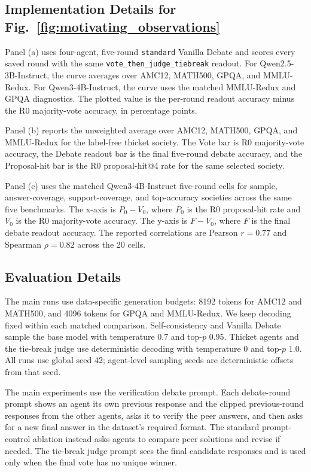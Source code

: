 \documentclass{article}
\newcommand{\figref}[1]{Fig.~\ref{#1}}
\begin{document}
\subsection{Implementation Details for \figref{fig:motivating_observations}}
\label{app:motivating_observations}

Panel (a) uses four-agent, five-round \texttt{standard} Vanilla Debate and scores
every saved round with the same \texttt{vote\_then\_judge\_tiebreak} readout.
For Qwen2.5-3B-Instruct, the curve averages over AMC12, MATH500, GPQA, and
MMLU-Redux. For Qwen3-4B-Instruct, the curve uses the
matched MMLU-Redux and GPQA diagnostics. The plotted value is the per-round
readout accuracy minus the R0 majority-vote accuracy, in percentage points.

Panel (b) reports the unweighted average over AMC12, MATH500, GPQA, and
MMLU-Redux for the label-free thicket society. The Vote bar is R0
majority-vote accuracy, the Debate readout bar is the final five-round debate
accuracy, and the Proposal-hit bar is the R0 proposal-hit@4 rate for the same
selected society.

Panel (c) uses the matched Qwen3-4B-Instruct five-round cells for sample,
answer-coverage, support-coverage, and top-accuracy societies across the same
five benchmarks. The x-axis is $P_0 - V_0$, where $P_0$ is the R0 proposal-hit
rate and $V_0$ is the R0 majority-vote accuracy. The y-axis is $F - V_0$, where
$F$ is the final debate readout accuracy. The reported correlations are Pearson
$r=0.77$ and Spearman $\rho=0.82$ across the 20 cells.

\subsection{Evaluation Details}
\label{app:eval_details}

The main runs use data-specific generation budgets: 8192 tokens for AMC12 and
MATH500, and 4096 tokens for GPQA and MMLU-Redux. We keep
decoding fixed within each matched comparison. Self-consistency and Vanilla
Debate sample the base model with temperature 0.7 and top-$p$ 0.95. Thicket
agents and the tie-break judge use deterministic decoding with temperature 0
and top-$p$ 1.0. All runs use global seed 42; agent-level sampling seeds are
deterministic offsets from that seed.

The main experiments use the verification debate prompt. Each debate-round
prompt shows an agent its own previous response and the clipped previous-round
responses from the other agents, asks it to verify the peer answers, and then
asks for a new final answer in the dataset's required format. The standard
prompt-control ablation instead asks agents to compare peer solutions and
revise if needed. The tie-break judge prompt sees the final candidate responses
and is used only when the final vote has no unique winner.
\end{document}

